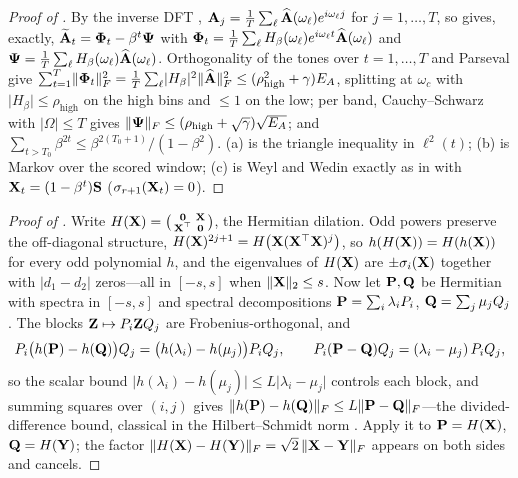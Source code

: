 \documentclass[11pt,a4paper]{article}
\theoremstyle{remark}
\newcommand{\rhohigh}{\rho_{\mathrm{high}}}
\begin{document}
\begin{proof}[Proof of ]
By the inverse DFT , $\mathbf{A}_j=\tfrac1T\sum_\ell\widehat{\mathbf{A}}(\omega_\ell)e^{i\omega_\ell j}$ for $j=1,\dots,T$, so  gives, exactly, $\widetilde{\mathbf{A}}_t=\bm{\Phi}_t-\beta^t\bm{\Psi}$ with $\bm{\Phi}_t=\tfrac1T\sum_\ell H_\beta(\omega_\ell)e^{i\omega_\ell t}\widehat{\mathbf{A}}(\omega_\ell)$ and $\bm{\Psi}=\tfrac1T\sum_\ell H_\beta(\omega_\ell)\widehat{\mathbf{A}}(\omega_\ell)$.
Orthogonality of the tones over $t=1,\dots,T$ and Parseval give $\sum_{t=1}^T\lVert\Phibf_t\rVert_F^2=\tfrac1T\sum_\ell\lvert H_\beta\rvert^2\lVert\hat\Abf\rVert_F^2 \le(\rhohigh^2+\gamma)E_A$, splitting at $\omega_c$ with $\lvert H_\beta\rvert\le\rhohigh$ on the high bins and $\le1$ on the low; per band, Cauchy--Schwarz with $\lvert\Omega\rvert\le T$ gives $\lVert\Psibf\rVert_F\le(\rhohigh+\sqrt\gamma)\sqrt{E_A}$; and $\sum_{t>T_0}\beta^{2t}\le\beta^{2(T_0+1)}/(1-\beta^2)$.
(a) is the triangle inequality in $\ell^2(t)$; (b) is Markov over the scored window; (c) is Weyl and Wedin exactly as in  with $\mathbf{X}_t=(1-\beta^t)\mathbf{S}$ ($\sigma_{r+1}(\mathbf{X}_t)=0$).
\end{proof}

\begin{proof}[Proof of ]
Write $H(\mathbf{X})=\bigl(\begin{smallmatrix}\mathbf{0}&\mathbf{X}\\\mathbf{X}^\top&\mathbf{0}\end{smallmatrix}\bigr)$, the Hermitian dilation.
Odd powers preserve the off-diagonal structure, $H(\mathbf{X})^{2j+1}=H\bigl(\mathbf{X}(\mathbf{X}^\top\mathbf{X})^{j}\bigr)$, so $h(H(\mathbf{X}))=H(h(\mathbf{X}))$ for every odd polynomial $h$, and the eigenvalues of $H(\mathbf{X})$ are $\pm\sigma_i(\mathbf{X})$ together with $\lvert d_1-d_2\rvert$ zeros---all in $[-s,s]$ when $\lVert\mathbf{X}\rVert_2\le s$.
Now let $\mathbf{P},\mathbf{Q}$ be Hermitian with spectra in $[-s,s]$ and spectral decompositions $\mathbf{P}=\sum_i\lambda_iP_i$, $\mathbf{Q}=\sum_j\mu_jQ_j$.
The blocks $\mathbf{Z}\mapsto P_i\mathbf{Z} Q_j$ are Frobenius-orthogonal, and
\[
P_i\bigl(h(\mathbf{P})-h(\mathbf{Q})\bigr)Q_j=\bigl(h(\lambda_i)-h(\mu_j)\bigr)P_iQ_j,
\qquad
P_i(\mathbf{P}-\mathbf{Q})Q_j=(\lambda_i-\mu_j)\,P_iQ_j,
\]
so the scalar bound $\lvert h(\lambda_i)-h(\mu_j)\rvert\le L\lvert\lambda_i-\mu_j\rvert$ controls each block, and summing squares over $(i,j)$ gives $\lVert h(\mathbf{P})-h(\mathbf{Q})\rVert_F\le L\lVert\mathbf{P}-\mathbf{Q}\rVert_F$---the divided-difference bound, classical in the Hilbert--Schmidt norm \citep{bhatia1997matrix}.
Apply it to $\mathbf{P}=H(\mathbf{X})$, $\mathbf{Q}=H(\mathbf{Y})$; the factor $\lVert H(\mathbf{X})-H(\mathbf{Y})\rVert_F=\sqrt2\,\lVert\mathbf{X}-\mathbf{Y}\rVert_F$ appears on both sides and cancels.
\end{proof}
\end{document}
